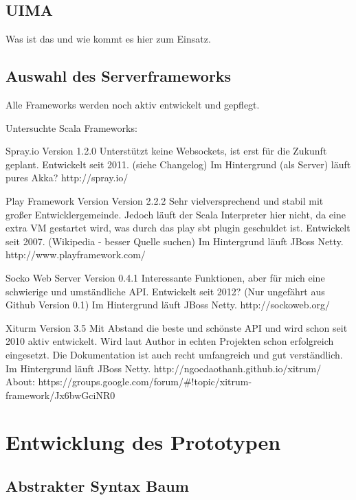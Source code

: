 \section{UIMA}

Was ist das und wie kommt es hier zum Einsatz.


\section{Auswahl des Serverframeworks}                         \label{sec.server}

Alle Frameworks werden noch aktiv entwickelt und gepflegt.

Untersuchte Scala Frameworks:

Spray.io Version 1.2.0
Unterstützt keine Websockets, ist erst für die Zukunft geplant.
Entwickelt seit 2011. (siehe Changelog)
Im Hintergrund (als Server) läuft pures Akka?
http://spray.io/

Play Framework Version Version 2.2.2
Sehr vielversprechend und stabil mit großer Entwicklergemeinde.
Jedoch läuft der Scala Interpreter hier nicht, da eine extra VM gestartet
wird, was durch das play sbt plugin geschuldet ist.
Entwickelt seit 2007. (Wikipedia - besser Quelle suchen)
Im Hintergrund läuft JBoss Netty.
http://www.playframework.com/

Socko Web Server Version 0.4.1
Interessante Funktionen, aber für mich eine schwierige und umständliche API.
Entwickelt seit 2012? (Nur ungefährt aus Github Version 0.1)
Im Hintergrund läuft JBoss Netty.
http://sockoweb.org/

Xiturm Version 3.5
Mit Abstand die beste und schönste API und wird schon seit 2010 aktiv entwickelt.
Wird laut Author in echten Projekten schon erfolgreich eingesetzt.
Die Dokumentation ist auch recht umfangreich und gut verständlich.
Im Hintergrund läuft JBoss Netty.
http://ngocdaothanh.github.io/xitrum/
About: https://groups.google.com/forum/#!topic/xitrum-framework/Jx6bwGciNR0



\chapter{Entwicklung des Prototypen}


\section{Abstrakter Syntax Baum}

